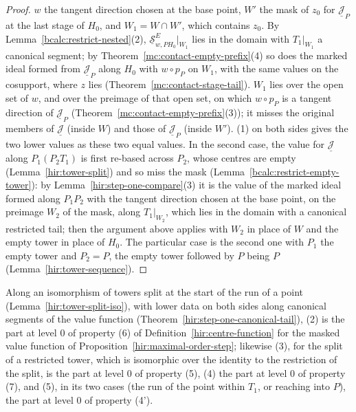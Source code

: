 \begin{proof}
\(w\) the tangent direction chosen at the base point, \(W'\) the mask of \(z_0\) for \(\underline{\mathcal J}_P\) at the last stage of \(H_0\), and \(W_1=W\cap W'\), which
contains \(z_0\). By Lemma~\ref{bcalc:restrict-nested}(2), \(\underline{\mathcal S}^E_{w,PH_0}|_{W_1}\) lies in the domain with \(T_1|_{W_1}\) a canonical segment; by
Theorem~\ref{mc:contact-empty-prefix}(4) so does the marked ideal formed from \(\underline{\mathcal J}_P\) along \(H_0\) with \(w\circ p_P\) on \(W_1\), with the same values on the
cosupport, where \(z\) lies (Theorem~\ref{mc:contact-stage-tail}). \(W_1\) lies over the open set of \(w\), and over the preimage of that open set, on which \(w\circ p_P\) is a
tangent direction of \(\underline{\mathcal J}_P\) (Theorem~\ref{mc:contact-empty-prefix}(3)); it misses the original members of \(\underline{\mathcal J}\) (inside \(W\)) and those of
\(\underline{\mathcal J}_P\) (inside \(W'\)). (1) on both sides gives the two lower values as these two equal values. In the second case, the value for
\(\underline{\mathcal J}\) along \(P_1(P_2T_1)\) is first re-based across \(P_2\), whose centres are empty (Lemma~\ref{hir:tower-split}) and so miss the mask
(Lemma~\ref{bcalc:restrict-empty-tower}): by Lemma~\ref{hir:step-one-compare}(3) it is the value of the marked ideal formed along \(P_1P_2\) with the tangent direction chosen at the
base point, on the preimage \(W_2\) of the mask, along \(T_1|_{W_2}\), which lies in the domain with a canonical restricted tail; then the argument above applies with \(W_2\) in
place of \(W\) and the empty tower in place of \(H_0\). The particular case is the second one with \(P_1\) the empty tower and \(P_2=P\), the empty tower followed
by \(P\) being \(P\) (Lemma~\ref{hir:tower-sequence}).
\end{proof}
Along an isomorphism of towers split at the start of the run of a point (Lemma~\ref{hir:tower-split-iso}), with lower data on both sides along canonical segments of the
value function (Theorem~\ref{hir:step-one-canonical-tail}), (2) is the part at level \(0\) of property (6) of Definition~\ref{hir:centre-function} for the masked value function
of Proposition~\ref{hir:maximal-order-step}; likewise (3), for the split of a restricted tower, which is isomorphic over the identity to the restriction of the split, is the part
at level \(0\) of property (5), (4) the part at level \(0\) of property (7), and (5), in its two cases (the run of the point within \(T_1\), or reaching into \(P\)), the part at
level \(0\) of property (4').

